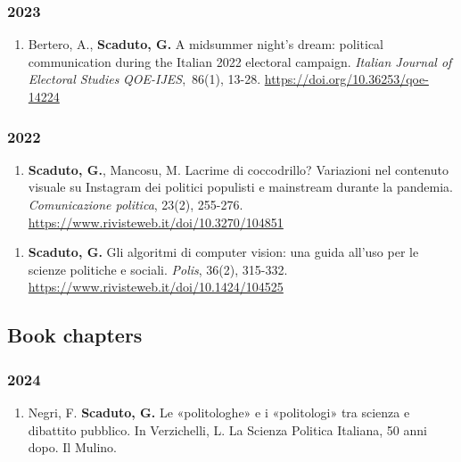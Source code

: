 \documentclass[10pt,]{article}
\providecommand{\tightlist}{%
  \setlength{\itemsep}{0pt}\setlength{\parskip}{0pt}}
\begin{document}
\subsubsection{\texorpdfstring{\textbf{2023}}{2023}}\label{section-2}

\begin{enumerate}
\def\labelenumi{\arabic{enumi}.}
\setcounter{enumi}{2}
\tightlist
\item
  Bertero, A., \textbf{Scaduto, G.} A midsummer night's dream: political
  communication during the Italian 2022 electoral campaign.
  \emph{Italian Journal of Electoral Studies} \emph{QOE-IJES},~86(1),
  13-28. \url{https://doi.org/10.36253/qoe-14224}
\end{enumerate}

\subsubsection{2022}\label{section-3}

\begin{enumerate}
\def\labelenumi{\arabic{enumi}.}
\setcounter{enumi}{1}
\tightlist
\item
  \textbf{Scaduto, G.}, Mancosu, M. Lacrime di coccodrillo? Variazioni
  nel contenuto visuale su Instagram dei politici populisti e mainstream
  durante la pandemia. \emph{Comunicazione politica}, 23(2), 255-276.
  \url{https://www.rivisteweb.it/doi/10.3270/104851}
\end{enumerate}

\begin{enumerate}
\def\labelenumi{\arabic{enumi}.}
\tightlist
\item
  \textbf{Scaduto, G.} Gli algoritmi di computer vision: una guida
  all'uso per le scienze politiche e sociali. \emph{Polis}, 36(2),
  315-332. \url{https://www.rivisteweb.it/doi/10.1424/104525}
\end{enumerate}

\subsection{Book chapters}\label{book-chapters}

\subsubsection{2024}\label{section-4}

\begin{enumerate}
\def\labelenumi{\arabic{enumi}.}
\tightlist
\item
  Negri, F. \textbf{Scaduto, G.} Le «politologhe» e i «politologi» tra
  scienza e dibattito pubblico. In Verzichelli, L. La Scienza Politica
  Italiana, 50 anni dopo. Il Mulino.
\end{enumerate}
\end{document}
